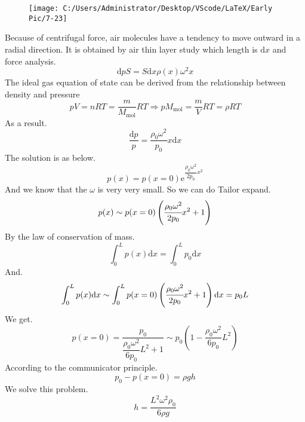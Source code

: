 \documentclass[12pt,a4paper]{article}%
\renewcommand{\d}{\mathrm{d}}
\begin{document}
	 \begin{figure}[h]
	 	\centering
	 	\texttt{[image: C:/Users/Administrator/Desktop/VScode/LaTeX/Early Pic/7-23]}
	 	\caption*{}
	 	\label{fig:7-23}
	 	\end{figure}
	 \noindent Because of centrifugal force, air molecules have a tendency to move outward in a radial direction. It is obtained by air thin layer study which length is $\d x$ and force analysis.
	 \begin{equation}
	 	\d pS=S\d x\rho(x)\omega^2x
	 \end{equation}
	 The ideal gas equation of state can be derived from the relationship between density and pressure
	 \begin{equation}
	 	pV=nRT=\frac{m}{M_\mathrm{mol}}RT\Longrightarrow pM_\mathrm{mol}=\frac{m}{V}RT=\rho RT
	 \end{equation}
	 As a result.
	 \begin{equation}
	 	\frac{\mathrm{d}p}{p}=\frac{\rho _0\omega ^2}{p_0}x\mathrm{d}x
	 \end{equation}
	 The solution is as below.
	 \begin{equation}
	 	p\left( x \right) =p\left( x=0 \right) \mathrm{e}^{\dfrac{\rho _0\omega ^2}{2p_0}\displaystyle{x^2} }
	 \end{equation}
	 And we know that the $\omega$ is very very small. So we can do Tailor expand.
	 \begin{equation}
	 	p(x)\sim p(x=0)\left( \cfrac{\rho _0\omega ^2}{2p_0}x^2+1\right) 
	 \end{equation}
	 By the law of conservation of mass.
	 \begin{equation}
	 	\int_{0}^{L}p(x)\d x=\int_{0}^{L}p_0\d x
	 \end{equation}
	 And.
	 \begin{equation}
	 	\int_{0}^{L}p(x)\d x\sim\int_{0}^{L}p(x=0)\left( \cfrac{\rho _0\omega ^2}{2p_0}x^2+1\right) \d x=p_0L
	 \end{equation}
	 We get.
	 \begin{equation}
	 	p(x=0)=\dfrac{p_0}{\dfrac{\rho _0\omega ^2}{6p_0}L^2+1}\sim p_0\left( 1-\frac{\rho _0\omega ^2}{6p_0}L^2\right) 
	 \end{equation}
	 According to the communicator principle.
	 \begin{equation}
	 	p_0-p(x=0)=\rho gh
	 \end{equation}
	 We solve this problem.
	 $$
	 h=\frac{L^2\omega^2\rho_0}{6\rho g}
	 $$
\end{document}
